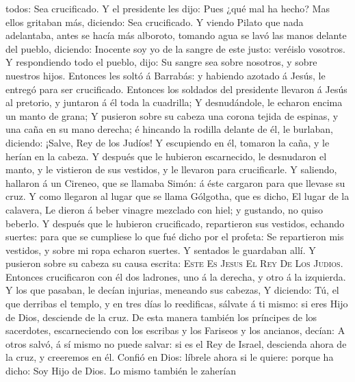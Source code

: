 todos: Sea crucificado.  Y el presidente les dijo: Pues
¿qué mal ha hecho? Mas ellos gritaban más, diciendo: Sea crucificado.
 Y viendo Pilato que nada adelantaba, antes se hacía más
alboroto, tomando agua se lavó las manos delante del pueblo, diciendo:
Inocente soy yo de la sangre de este justo: veréislo vosotros.
 Y respondiendo todo el pueblo, dijo: Su sangre sea sobre
nosotros, y sobre nuestros hijos.  Entonces les soltó á
Barrabás: y habiendo azotado á Jesús, le entregó para ser crucificado.
 Entonces los soldados del presidente llevaron á Jesús al
pretorio, y juntaron á él toda la cuadrilla;  Y
desnudándole, le echaron encima un manto de grana;  Y
pusieron sobre su cabeza una corona tejida de espinas, y una caña en su
mano derecha; é hincando la rodilla delante de él, le burlaban,
diciendo: ¡Salve, Rey de los Judíos!  Y escupiendo en él,
tomaron la caña, y le herían en la cabeza.  Y después que
le hubieron escarnecido, le desnudaron el manto, y le vistieron de sus
vestidos, y le llevaron para crucificarle.  Y saliendo,
hallaron á un Cireneo, que se llamaba Simón: á éste cargaron para que
llevase su cruz.  Y como llegaron al lugar que se llama
Gólgotha, que es dicho, El lugar de la calavera,  Le
dieron á beber vinagre mezclado con hiel; y gustando, no quiso beberlo.
 Y después que le hubieron crucificado, repartieron sus
vestidos, echando suertes: para que se cumpliese lo que fué dicho por el
profeta: Se repartieron mis vestidos, y sobre mi ropa echaron suertes.
 Y sentados le guardaban allí.  Y pusieron
sobre su cabeza su causa escrita: \textsc{Este} \textsc{Es}
\textsc{Jesus} \textsc{El} \textsc{Rey} \textsc{De} \textsc{Los}
\textsc{Judios}.  Entonces crucificaron con él dos
ladrones, uno á la derecha, y otro á la izquierda.  Y los
que pasaban, le decían injurias, meneando sus cabezas,  Y
diciendo: Tú, el que derribas el templo, y en tres días lo reedificas,
sálvate á ti mismo: si eres Hijo de Dios, desciende de la cruz.
 De esta manera también los príncipes de los sacerdotes,
escarneciendo con los escribas y los Fariseos y los ancianos, decían:
 A otros salvó, á sí mismo no puede salvar: si es el Rey
de Israel, descienda ahora de la cruz, y creeremos en él.
 Confió en Dios: líbrele ahora si le quiere: porque ha
dicho: Soy Hijo de Dios.  Lo mismo también le zaherían
